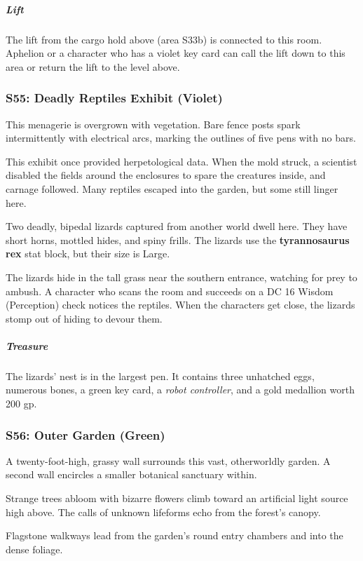 \documentclass[10pt,a4paper,twoside,bg=print,twocolumn,openany,nodeprecatedcode]{dndbook}
\begin{document}
\subparagraph{Lift}
The lift from the cargo hold above (area S33b) is connected to this room. Aphelion or a character who has a violet key card can call the lift down to this area or return the lift to the level above.

\subsubsection{S55: Deadly Reptiles Exhibit (Violet)}
\begin{DndReadAloud}{}
This menagerie is overgrown with vegetation. Bare fence posts spark intermittently with electrical arcs, marking the outlines of five pens with no bars.

\end{DndReadAloud}

This exhibit once provided herpetological data. When the mold struck, a scientist disabled the fields around the enclosures to spare the creatures inside, and carnage followed. Many reptiles escaped into the garden, but some still linger here.

Two deadly, bipedal lizards captured from another world dwell here. They have short horns, mottled hides, and spiny frills. The lizards use the \textbf{tyrannosaurus rex} stat block, but their size is Large.

The lizards hide in the tall grass near the southern entrance, watching for prey to ambush. A character who scans the room and succeeds on a DC 16 Wisdom (Perception) check notices the reptiles. When the characters get close, the lizards stomp out of hiding to devour them.

\subparagraph{Treasure}
The lizards' nest is in the largest pen. It contains three unhatched eggs, numerous bones, a green key card, a \textit{robot controller}, and a gold medallion worth 200 gp.

\subsubsection{S56: Outer Garden (Green)}
\begin{DndReadAloud}{}
A twenty-foot-high, grassy wall surrounds this vast, otherworldly garden. A second wall encircles a smaller botanical sanctuary within.

Strange trees abloom with bizarre flowers climb toward an artificial light source high above. The calls of unknown lifeforms echo from the forest's canopy.

Flagstone walkways lead from the garden's round entry chambers and into the dense foliage.

\end{DndReadAloud}
\end{document}
